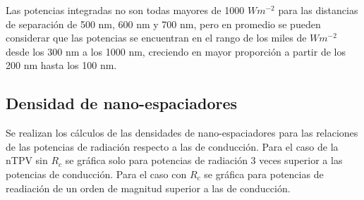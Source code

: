Las potencias integradas no son todas mayores de 1000 $Wm^{-2}$ para las distancias de separación de 500 nm, 600 nm y 700 nm, pero en promedio se pueden considerar que las potencias se encuentran en el rango de los miles de $Wm^{-2}$ desde los 300 nm a los 1000 nm, creciendo en mayor proporción a partir de los 200 nm hasta los 100 nm.
\subsection{Densidad de nano-espaciadores}
Se realizan los cálculos de las densidades de nano-espaciadores para las relaciones de las potencias de radiación respecto a las de conducción. Para el caso de la nTPV sin $R_c$ se gráfica solo para potencias de radiación 3 veces superior a las potencias de conducción. Para el caso con $R_c$ se gráfica para potencias de readiación de un orden de magnitud superior a las de conducción.
